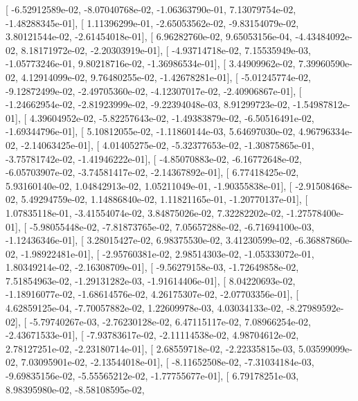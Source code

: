 \documentclass{article}
\begin{document}
       [ -6.52912589e-02,  -8.07040768e-02,  -1.06363790e-01,
          7.13079754e-02,  -1.48288345e-01],
       [  1.11396299e-01,  -2.65053562e-02,  -9.83154079e-02,
          3.80121544e-02,  -2.61454018e-01],
       [  6.96282760e-02,   9.65053156e-04,  -4.43484092e-02,
          8.18171972e-02,  -2.20303919e-01],
       [ -4.93714718e-02,   7.15535949e-03,  -1.05773246e-01,
          9.80218716e-02,  -1.36986534e-01],
       [  3.44909962e-02,   7.39960590e-02,   4.12914099e-02,
          9.76480255e-02,  -1.42678281e-01],
       [ -5.01245774e-02,  -9.12872499e-02,  -2.49705360e-02,
         -4.12307017e-02,  -2.40906867e-01],
       [ -1.24662954e-02,  -2.81923999e-02,  -9.22394048e-03,
          8.91299723e-02,  -1.54987812e-01],
       [  4.39604952e-02,  -5.82257643e-02,  -1.49383879e-02,
         -6.50516491e-02,  -1.69344796e-01],
       [  5.10812055e-02,  -1.11860144e-03,   5.64697030e-02,
          4.96796334e-02,  -2.14063425e-01],
       [  4.01405275e-02,  -5.32377653e-02,  -1.30875865e-01,
         -3.75781742e-02,  -1.41946222e-01],
       [ -4.85070883e-02,  -6.16772648e-02,  -6.05703907e-02,
         -3.74581417e-02,  -2.14367892e-01],
       [  6.77418425e-02,   5.93160140e-02,   1.04842913e-02,
          1.05211049e-01,  -1.90355838e-01],
       [ -2.91508468e-02,   5.49294759e-02,   1.14886840e-02,
          1.11821165e-01,  -1.20770137e-01],
       [  1.07835118e-01,  -3.41554074e-02,   3.84875026e-02,
          7.32282202e-02,  -1.27578400e-01],
       [ -5.98055448e-02,  -7.81873765e-02,   7.05657288e-02,
         -6.71694100e-03,  -1.12436346e-01],
       [  3.28015427e-02,   6.98375530e-02,   3.41230599e-02,
         -6.36887860e-02,  -1.98922481e-01],
       [ -2.95760381e-02,   2.98514303e-02,  -1.05333072e-01,
          1.80349214e-02,  -2.16308709e-01],
       [ -9.56279158e-03,  -1.72649858e-02,   7.51854963e-02,
         -1.29131282e-03,  -1.91614406e-01],
       [  8.04220693e-02,  -1.18916077e-02,  -1.68614576e-02,
          4.26175307e-02,  -2.07703356e-01],
       [  4.62859125e-04,  -7.70057882e-02,   1.22609978e-03,
          4.03034133e-02,  -8.27989592e-02],
       [ -5.79740267e-03,  -2.76230128e-02,   6.47115117e-02,
          7.08966254e-02,  -2.43671533e-01],
       [ -7.93783617e-02,  -2.11114538e-02,   4.98704612e-02,
          2.78127251e-02,  -2.23180714e-01],
       [  2.68559718e-02,  -2.22335815e-03,   5.03599099e-02,
          7.03095901e-02,  -2.13544018e-01],
       [ -8.11652508e-02,  -7.31034184e-03,  -9.69835156e-02,
         -5.55565212e-02,  -1.77755677e-01],
       [  6.79178251e-03,   8.98395980e-02,  -8.58108595e-02,
\end{document}
